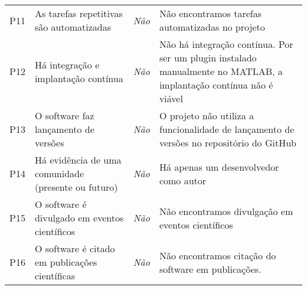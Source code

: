 \begin{table}[htbp]
\begin{tabular}{p{0.5cm}|p{4.8cm}|c|p{6cm}}
        P11 & As tarefas repetitivas são automatizadas  & \textit{Não} & Não encontramos tarefas automatizadas no projeto \\
        P12 & Há integração e implantação contínua  & \textit{Não} & Não há integração contínua. Por ser um plugin instalado manualmente no MATLAB, a implantação contínua não é viável \\
        P13 & O software faz lançamento de versões  & \textit{Não} & O projeto não utiliza a funcionalidade de lançamento de versões no repositório do GitHub \\
        P14 & Há evidência de uma comunidade (presente ou futuro) & \textit{Não} & Há apenas um desenvolvedor como autor \\ 
        P15 & O software é divulgado em eventos científicos  & \textit{Não} & Não encontramos divulgação em eventos científicos \\
        P16 & O software é citado em publicações científicas  & \textit{Não} & Não encontramos citação do software em publicações. \\
    \hline
    \end{tabular}
    \label{tab:ssi:criteria:garcia}
\end{table}


